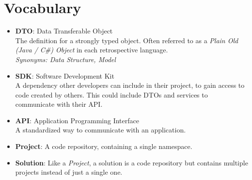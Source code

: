 \section*{Vocabulary}
\begin{itemize}
  \item \textbf{DTO}: Data Transferable Object \\
  The definition for a strongly typed object. Often referred to as a \textit{Plain Old (Java / C\#) Object} in each retrospective language. \\
  \textit{Synonyms: Data Structure, Model}
  
  \item \textbf{SDK}: Software Development Kit \\
  A dependency other developers can include in their project, to gain access to code created by others. This could include DTOs and services to communicate with their API.
  
  \item \textbf{API}: Application Programming Interface  \\
  A standardized way to communicate with an application.
  
  \item \textbf{Project}: A code repository, containing a single namespace.
  
  \item \textbf{Solution}: Like a \textit{Project}, a solution is a code repository but contains multiple projects instead of just a single one.

\end{itemize}